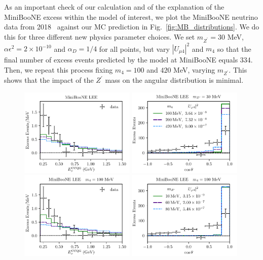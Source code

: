 As an important check of our calculation and of the explanation of the MiniBooNE excess within the model of interest, we plot the MiniBooNE neutrino data from 2018~\cite{Aguilar-Arevalo:2018gpe} against our MC prediction in Fig.~\ref{fig:MB_distributions}. We do this for three different new physics parameter choices. We set $m_{Z^\prime} = 30$ MeV, $\alpha \epsilon^2 = 2\times10^{-10}$ and $\alpha_D = 1/4$ for all points, but vary $|U_{\mu 4}|^2$ and $m_4$ so that the final number of excess events predicted by the model at MiniBooNE equals 334. Then, we repeat this process fixing $m_4 = 100$ and $420$ MeV, varying $m_{Z^\prime}$. This shows that the impact of the $Z^\prime$ mass on the angular distribution is minimal.
%
\begin{figure}[h!]
    \centering
    \includegraphics[width=0.49\textwidth]{Enu_reco.pdf}
    \includegraphics[width=0.49\textwidth]{Theta_reco.pdf}\\
    \includegraphics[width=0.49\textwidth]{Enu_reco_m4=100mev.pdf}
    \includegraphics[width=0.49\textwidth]{Theta_reco_m4=100mev.pdf}\\

\end{figure}
